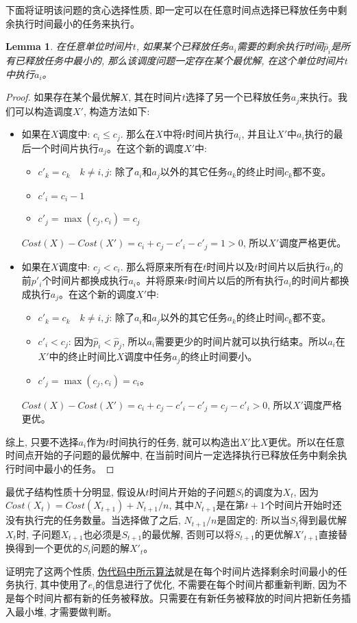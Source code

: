 \documentclass[paper=a4, fontsize=11pt]{scrartcl} %
\numberwithin{equation}{section} %
\numberwithin{figure}{section} %
\numberwithin{table}{section} %
\newtheorem{lemma}[theorem]{Lemma}
\begin{document}
\begin{enumerate}[a]
  下面将证明该问题的贪心选择性质, 即一定可以在任意时间点选择已释放任务中剩余执行时间最小的任务来执行。
  \begin{lemma}
    \label{lemma:2}
    在任意单位时间片$t$, 如果某个已释放任务$a_i$需要的剩余执行时间$\hat{p}_i$是所有已释放任务中最小的, 那么该调度问题一定存在某个最优解, 在这个单位时间片$t$中执行$a_i$。
  \end{lemma}
  \begin{proof}
    如果存在某个最优解$X$, 其在时间片$t$选择了另一个已释放任务$a_j$来执行。我们可以构造调度$X'$, 构造方法如下:
    \begin{itemize}
    \item 如果在$X$调度中: $c_i \leq c_j$. 那么在$X$中将$t$时间片执行$a_i$, 并且让$X'$中$a_i$执行的最后一个时间片执行$a_j$。在这个新的调度$X'$中:
      \begin{itemize}
      \item $c'_k = c_k \quad k \neq i, j$: 除了$a_i$和$a_j$以外的其它任务$a_k$的终止时间$c_k$都不变。
      \item $c'_i = c_i - 1$
      \item $c'_j = \max(c_j, c_i) = c_j$
      \end{itemize}
      $Cost(X) - Cost(X') = c_i + c_j - c'_i - c'_j = 1 > 0$, 所以$X'$调度严格更优。
    \item 如果在$X$调度中: $c_j < c_i$. 那么将原来所有在$t$时间片以及$t$时间片以后执行$a_j$的前$p'_i$个时间片都换成执行$a_i$。并将原来$t$时间片以后的所有执行$a_i$的时间片都换成执行$a_j$。在这个新的调度$X'$中:
      \begin{itemize}
      \item $c'_k = c_k \quad k \neq i, j$: 除了$a_i$和$a_j$以外的其它任务$a_k$的终止时间$c_k$都不变。
      \item $c'_i < c_j$: 因为$\hat{p}_i < \hat{p}_j$, 所以$a_i$需要更少的时间片就可以执行结束。所以$a_i$在$X'$中的终止时间比$X$调度中任务$a_j$的终止时间要小。
      \item $c'_j = \max(c_j, c_i) = c_i$。
      \end{itemize}
      $Cost(X) - Cost(X') = c_i + c_j - c'_i - c'_j = c_j - c'_i > 0$, 所以$X'$调度严格更优。
    \end{itemize}
    综上, 只要不选择$a_i$作为$t$时间执行的任务, 就可以构造出$X'$比$X$更优。所以在任意时间点开始的子问题的最优解中, 在当前时间片一定选择执行已释放任务中剩余执行时间中最小的任务。
  \end{proof}

  最优子结构性质十分明显, 假设从$t$时间片开始的子问题$S_t$的调度为$X_t$, 因为$Cost(X_t) = Cost(X_{t+1}) + N_{t+1}/n$, 其中$N_{t+1}$是在第$t+1$个时间片开始时还没有执行完的任务数量。当选择做了之后, $N_{t+1}/n$是固定的: 所以当$S_t$得到最优解$X_t$时, 子问题$X_{t+1}$也必须是$S_{t+1}$的最优解, 否则可以将$S_{t+1}$的更优解$X'_{t+1}$直接替换得到一个更优的$S_t$问题的解$X'_t$。

  证明完了这两个性质, \hyperref[algo:1]{伪代码中所示算法}就是在每个时间片选择剩余时间最小的任务执行, 其中使用了$e_i$的信息进行了优化, 不需要在每个时间片都重新判断, 因为不是每个时间片都有新的任务被释放。只需要在有新任务被释放的时间片把新任务插入最小堆, 才需要做判断。
\end{enumerate}
\end{document}
